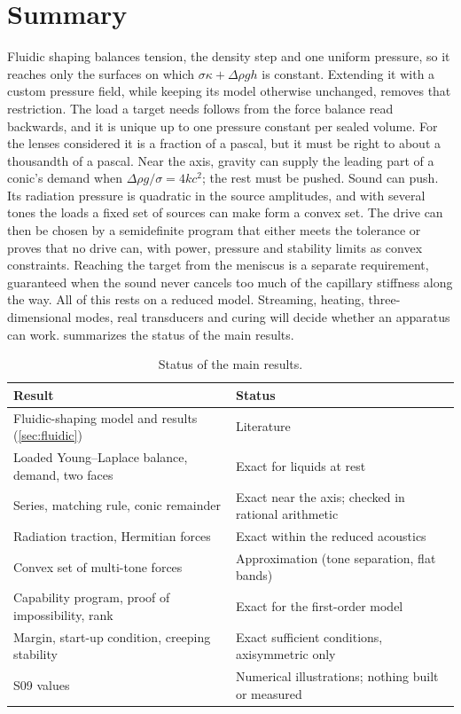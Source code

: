 \documentclass[11pt,a4paper]{article}
\numberwithin{equation}{section}
\begin{document}
\section{Summary}\label{sec:summary}
Fluidic shaping balances tension, the density step and one uniform pressure,
so it reaches only the surfaces on which $\sigma\kappa+\Delta\rho gh$ is
constant. Extending it with a custom pressure field, while keeping its model
otherwise unchanged, removes that restriction. The load a target needs follows from the force balance read
backwards, and it is unique up to one pressure constant per sealed volume. For
the lenses considered it is a fraction of a pascal, but it must be right to
about a thousandth of a pascal. Near the axis, gravity can supply the leading
part of a conic's demand when $\Delta\rho g/\sigma=4kc^2$; the rest must be
pushed. Sound can push. Its radiation pressure is quadratic in the source
amplitudes, and with several tones the loads a fixed set of sources can make
form a convex set. The drive can then be chosen by a semidefinite program that
either meets the tolerance or proves that no drive can, with power, pressure and
stability limits as convex constraints. Reaching the target from the meniscus
is a separate requirement, guaranteed when the sound never cancels too much of
the capillary stiffness along the way. All of this rests on a reduced model.
Streaming, heating, three-dimensional modes, real transducers and curing will
decide whether an apparatus can work.  summarizes the status of
the main results.

\begin{table}[ht]
\centering\small
\begin{tabular}{@{}>{\raggedright\arraybackslash}p{70mm}>{\raggedright\arraybackslash}p{84mm}@{}}
\toprule
Result & Status \\\midrule
Fluidic-shaping model and results (\cref{sec:fluidic}) & Literature
\cite{frumkin2021,elgarisi2021,elgarisi2021preprint}\\
Loaded Young--Laplace balance, demand, two faces & Exact for liquids at rest\\
Series, matching rule, conic remainder & Exact near the axis; checked in
rational arithmetic\\
Radiation traction, Hermitian forces & Exact within the reduced acoustics\\
Convex set of multi-tone forces & Approximation (tone separation, flat bands)\\
Capability program, proof of impossibility, rank & Exact for the first-order
model\\
Margin, start-up condition, creeping stability & Exact sufficient conditions,
axisymmetric only\\
S09 values & Numerical illustrations; nothing built or measured\\
\bottomrule
\end{tabular}
\caption{Status of the main results.}
\label{tab:status}
\end{table}
\end{document}
